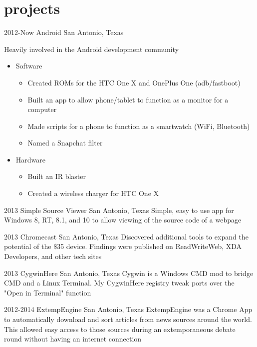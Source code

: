 \documentclass[]{friggeri-cv} %
\begin{document}
\section{projects}

\begin{entrylist}


\entry
{2012-Now}
{Android}
{San Antonio, Texas}
{Heavily involved in the Android development community 
\begin{itemize}
	\item Software
	\begin{itemize} 
		\item Created ROMs for the HTC One X and OnePlus One (adb/fastboot)  
		\item Built an app to allow phone/tablet to function as a  monitor for a computer
		\item Made scripts for a phone to function as a smartwatch (WiFi, Bluetooth)
		\item Named a Snapchat filter 
	\end{itemize} 
	\item Hardware 
	\begin{itemize}
		\item Built an IR blaster 
		\item Created a wireless charger for HTC One X 
	\end{itemize}
\end{itemize}
}


\entry
{2013}
{Simple Source Viewer}
{San Antonio, Texas}
{Simple, easy to use app for Windows 8, RT, 8.1, and 10 to allow viewing of the source code of a webpage}


\entry
{2013}
{Chromecast}
{San Antonio, Texas}
{Discovered additional tools to expand the potential of the \$35 device. Findings were published on ReadWriteWeb, XDA Developers, and other tech sites}


\entry
{2013}
{CygwinHere}
{San Antonio, Texas}
{Cygwin is a Windows CMD mod to bridge CMD and a Linux Terminal. My CygwinHere registry tweak ports over the "Open in Terminal" function}


\entry
{2012-2014}
{ExtempEngine}
{San Antonio, Texas}
{ExtempEngine was a Chrome App to automatically download and sort articles from news sources around the world. This allowed easy access to those sources during an extemporaneous debate round without having an internet connection}


\end{entrylist}
\pagebreak 
\end{document}
